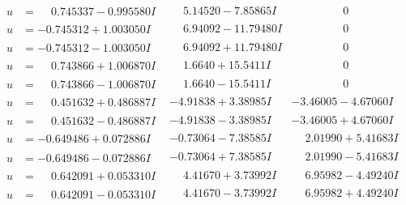 \documentclass[1p]{elsarticle_modified}
\theoremstyle{definition}
\begin{document}
$$\begin{array}{c|c|c}
\begin{aligned}
u &= \phantom{-}0.745337 - 0.995580 I\end{aligned}
 & \phantom{-}5.14520 - 7.85865 I & \phantom{-0.000000 } 0 \\ \hline\begin{aligned}
u &= -0.745312 + 1.003050 I\end{aligned}
 & \phantom{-}6.94092 - 11.79480 I & \phantom{-0.000000 } 0 \\ \hline\begin{aligned}
u &= -0.745312 - 1.003050 I\end{aligned}
 & \phantom{-}6.94092 + 11.79480 I & \phantom{-0.000000 } 0 \\ \hline\begin{aligned}
u &= \phantom{-}0.743866 + 1.006870 I\end{aligned}
 & \phantom{-}1.6640 + 15.5411 I & \phantom{-0.000000 } 0 \\ \hline\begin{aligned}
u &= \phantom{-}0.743866 - 1.006870 I\end{aligned}
 & \phantom{-}1.6640 - 15.5411 I & \phantom{-0.000000 } 0 \\ \hline\begin{aligned}
u &= \phantom{-}0.451632 + 0.486887 I\end{aligned}
 & -4.91838 + 3.38985 I & -3.46005 - 4.67060 I \\ \hline\begin{aligned}
u &= \phantom{-}0.451632 - 0.486887 I\end{aligned}
 & -4.91838 - 3.38985 I & -3.46005 + 4.67060 I \\ \hline\begin{aligned}
u &= -0.649486 + 0.072886 I\end{aligned}
 & -0.73064 - 7.38585 I & \phantom{-}2.01990 + 5.41683 I \\ \hline\begin{aligned}
u &= -0.649486 - 0.072886 I\end{aligned}
 & -0.73064 + 7.38585 I & \phantom{-}2.01990 - 5.41683 I \\ \hline\begin{aligned}
u &= \phantom{-}0.642091 + 0.053310 I\end{aligned}
 & \phantom{-}4.41670 + 3.73992 I & \phantom{-}6.95982 - 4.49240 I \\ \hline\begin{aligned}
u &= \phantom{-}0.642091 - 0.053310 I\end{aligned}
 & \phantom{-}4.41670 - 3.73992 I & \phantom{-}6.95982 + 4.49240 I \\ \hline\begin{aligned}

\end{aligned}
\end{array}$$
\end{document}
